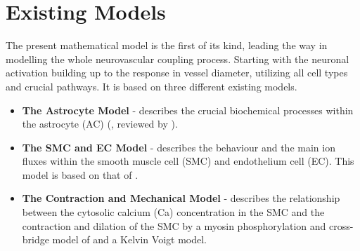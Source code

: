 \section{Existing Models}

The present mathematical model is the first of its kind, leading the way in modelling the whole neurovascular coupling process. Starting with the neuronal activation building up to the response in vessel diameter, utilizing all cell types and crucial pathways.  It is based on three different existing models. 

\begin{itemize}
\item \textbf{The Astrocyte Model} - describes the crucial biochemical processes within the astrocyte (AC) (\citet{Ostby2009}, reviewed  by \citet{LoesEvert}). 
\item  \textbf{The SMC and EC Model} - describes the behaviour and the main ion fluxes within the smooth muscle cell (SMC) and endothelium cell (EC). This model is based on that of \citet{Koenigsberger2006}. 
\item \textbf{The Contraction and Mechanical Model} -  describes the relationship between the cytosolic calcium (\gls{Ca}) concentration in the SMC and the contraction and dilation of the SMC by a myosin phosphorylation and cross-bridge model of \citet{Hai1989} and a Kelvin Voigt model. \\
\end{itemize}


